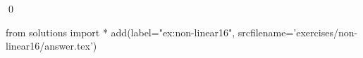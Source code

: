 
\begin{ex} 
  \label{ex:non-linear16}
  
  \qed
\end{ex} 
\begin{python0}
from solutions import *
add(label="ex:non-linear16",
    srcfilename='exercises/non-linear16/answer.tex') 
\end{python0}
